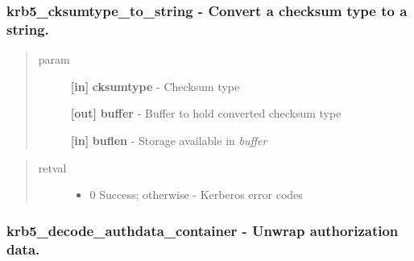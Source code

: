 \documentclass[letterpaper,10pt,english]{sphinxmanual}
\begin{document}
\subsubsection{krb5\_cksumtype\_to\_string -  Convert a checksum type to a string.}
\label{appdev/refs/api/krb5_cksumtype_to_string::doc}\label{appdev/refs/api/krb5_cksumtype_to_string:krb5-cksumtype-to-string-convert-a-checksum-type-to-a-string}

\begin{fulllineitems}
\label{appdev/refs/api/krb5_cksumtype_to_string:krb5_cksumtype_to_string}
\end{fulllineitems}

\begin{quote}\begin{description}
\item[{param}] \leavevmode
\textbf{{[}in{]}} \textbf{cksumtype} - Checksum type

\textbf{{[}out{]}} \textbf{buffer} - Buffer to hold converted checksum type

\textbf{{[}in{]}} \textbf{buflen} - Storage available in \emph{buffer}

\end{description}\end{quote}
\begin{quote}\begin{description}
\item[{retval}] \leavevmode\begin{itemize}
\item {} 
0   Success; otherwise - Kerberos error codes

\end{itemize}

\end{description}\end{quote}


\subsubsection{krb5\_decode\_authdata\_container -  Unwrap authorization data.}
\label{appdev/refs/api/krb5_decode_authdata_container::doc}\label{appdev/refs/api/krb5_decode_authdata_container:krb5-decode-authdata-container-unwrap-authorization-data}
\end{document}
